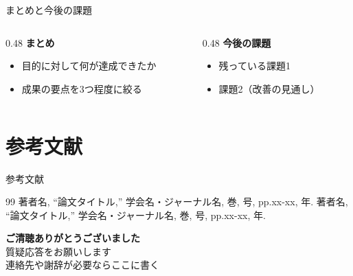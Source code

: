 \documentclass[uplatex,dvipdfmx,aspectratio=169]{beamer}
\begin{document}
\begin{frame}{まとめと今後の課題}
  \begin{columns}[t]
    \begin{column}{0.48\linewidth}
      \textbf{まとめ}
      \begin{itemize}
        \item 目的に対して何が達成できたか
        \item 成果の要点を3つ程度に絞る
      \end{itemize}
    \end{column}
    \begin{column}{0.48\linewidth}
      \textbf{今後の課題}
      \begin{itemize}
        \item 残っている課題1
        \item 課題2（改善の見通し）
      \end{itemize}
    \end{column}
  \end{columns}
\end{frame}

\section*{参考文献}
\begin{frame}{参考文献}
  \begin{thebibliography}{99}
      著者名, ``論文タイトル,'' 学会名・ジャーナル名, 巻, 号, pp.xx-xx, 年.
      著者名, ``論文タイトル,'' 学会名・ジャーナル名, 巻, 号, pp.xx-xx, 年.
  \end{thebibliography}
\end{frame}

\begin{frame}[plain]
  \centering
  \vspace{2cm}
  {\Huge\bfseries ご清聴ありがとうございました}\\[1.5em]
  {\Large 質疑応答をお願いします}\\[3cm]
  {\small 連絡先や謝辞が必要ならここに書く}
\end{frame}
\end{document}
